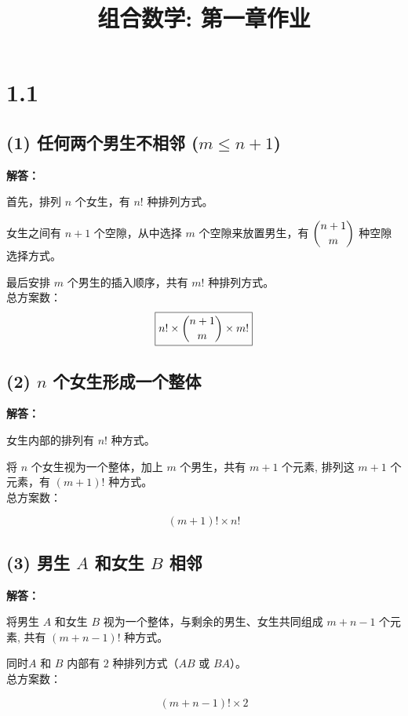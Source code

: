 \documentclass{article}
\title{组合数学: 第一章作业}
\begin{document}
\maketitle

\section*{1.1}

\subsection*{(1) 任何两个男生不相邻 ($m \leq n + 1$)}

\textbf{解答：}

首先，排列 $n$ 个女生，有 $n!$ 种排列方式。

女生之间有 $n + 1$ 个空隙，从中选择 $m$ 个空隙来放置男生，有 $\dbinom{n+1}{m}$ 种空隙选择方式。

最后安排 $m$ 个男生的插入顺序，共有 $m!$ 种排列方式。\\

总方案数：
\[
 \boxed{n! \times \dbinom{n+1}{m} \times m!}
\]

\subsection*{(2) $n$ 个女生形成一个整体}

\textbf{解答：}

女生内部的排列有 $n!$ 种方式。

将 $n$ 个女生视为一个整体，加上 $m$ 个男生，共有 $m + 1$ 个元素, 排列这 $m + 1$ 个元素，有 $(m + 1)!$ 种方式。\\

总方案数：

\[
\boxed{(m + 1)! \times n!}
\]

\subsection*{(3) 男生 $A$ 和女生 $B$ 相邻}

\textbf{解答：}

将男生 $A$ 和女生 $B$ 视为一个整体，与剩余的男生、女生共同组成 $m + n - 1$ 个元素, 共有 $(m + n - 1)!$ 种方式。

同时$A$ 和 $B$ 内部有 $2$ 种排列方式（$AB$ 或 $BA$）。\\

总方案数：

\[
\boxed{(m + n - 1)! \times 2}
\]
\end{document}

